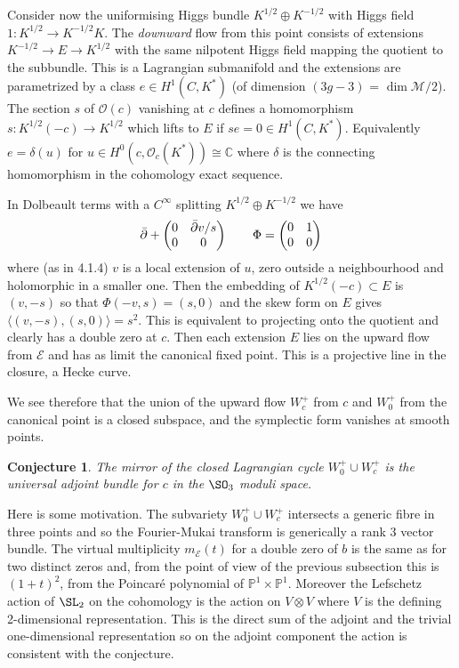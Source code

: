 \documentclass[12pt]{article}
\numberwithin{equation}{section}
\newtheorem{conjecture}[theorem]{Conjecture}
\theoremstyle{remark}
\theoremstyle{definition}
\numberwithin{theorem}{section}
\def\calE{{\mathcal E}}
\def\C{\mathbb{C}}
\renewcommand{\1}{\mathbbm{1}}
\def\PP {\mathbb{P}}
\begin{document}
Consider now the uniformising Higgs bundle $K^{1/2}\oplus K^{-1/2}$ with Higgs field $1: K^{1/2}\rightarrow K^{-1/2}K$. The {\it downward}  
flow from this point consists of extensions $K^{-1/2}\rightarrow E\rightarrow K^{1/2}$ with the same nilpotent Higgs field mapping the quotient to the subbundle. This is a Lagrangian submanifold and the 
extensions are parametrized by a class $e\in H^1(C,K^*)$ (of  dimension $(3g-3)$ = $\dim {\mathcal M}/2$). The section $s$
of ${\mathcal O}(c)$ 
vanishing at $c$ defines a homomorphism $s:K^{1/2}(-c)\rightarrow K^{1/2}$ which lifts to $E$ if $se=0\in  H^1(C,K^*)$. Equivalently
$e=\delta(u)$ for
$u\in H^0(c,{\mathcal O}_c(K^*))\cong \C$ where $\delta$ is the connecting homomorphism in the cohomology exact sequence.  

In Dolbeault terms with a $C^{\infty}$ splitting $K^{1/2}\oplus K^{-1/2}$ we have 
$$\bar\partial+ \begin{pmatrix}0 & \bar\partial v/s\cr
0 & 0\end{pmatrix}\qquad \Phi= \begin{pmatrix}0 & 1\cr
0 & 0\end{pmatrix} $$
where (as in 4.1.4) $v$ is a local extension of $u$, zero outside a neighbourhood and holomorphic in a smaller one.  Then the embedding of $K^{1/2}(-c)\subset E$ is $(v,-s)$ so that $\Phi(-v,s)=(s,0)$ and 
the skew form 
on $E$ gives 
$\langle (v,-s),(s,0)\rangle= s^2$. This is equivalent to projecting onto the quotient and clearly has a double zero at $c$. Then each extension $E$ 
lies on the upward flow from ${\mathcal E}$ and has as limit the canonical fixed point. This is a projective line in the closure, a Hecke curve. 


We see therefore that the union of the upward flow $W^+_c$ from $c$ and $W^+_0$ from the canonical point is a closed subspace, and the symplectic form vanishes at  smooth points. 

\begin{conjecture}  The mirror
	of the closed Lagrangian cycle $W^+_0\cup W^+_c$ is the universal adjoint bundle for $c$ in the $\SO_3$ moduli space. \end{conjecture}

Here is some motivation.  The subvariety $W^+_0\cup W^+_c$ intersects a generic fibre in three points and so the Fourier-Mukai transform is generically a rank $3$
vector bundle. The virtual multiplicity $m_\calE(t)$ for a double zero of $b$ is the same as for two distinct zeros and, from the point of view of the previous subsection this is  $(1+t)^2$, from the Poincar\'e polynomial of $\PP^1\times \PP^1$. Moreover the Lefschetz action of $\SL_2$ on the cohomology is the action on $V\otimes V$ where $V$ is the defining 2-dimensional representation. This is the direct sum of the adjoint  and the trivial one-dimensional 
representation so on the adjoint component the action is consistent with the conjecture.
\end{document}
